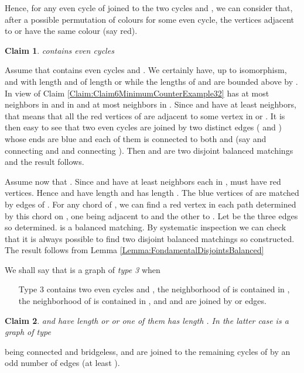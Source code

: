\documentclass{elsart}
\theoremstyle{plain} \theoremheaderfont{\scshape}
\newtheorem{Clm}{Claim}[Thm]
\newenvironment{Prf}{{\bf \noindent Proof } }{\hfill\\}
\newenvironment{PrfClaim}{{\bf Proof }}{{\hfill\tiny{\\}}}
\begin{document}
\begin{Prf}
Hence, for any even cycle of   joined to the two cycles
 and , we can consider that, after a possible permutation
of colours for some even cycle,  the vertices adjacent to  or
 have the same colour (say red).

\begin{Clm} \label{Claim:Claim7MinimumCounterExample32}
 contains  even cycles
\end{Clm}
\begin{PrfClaim}
Assume that  contains  even cycles  and
. We certainly have, up to isomorphism,  and  with
length  and  of length  or  while the lengths of 
and  are bounded above by . In view of Claim
\ref{Claim:Claim6MinimumCounterExample32}  has at most
 neighbors in  and in  and at most  neighbors in
. Since  and  have at least  neighbors, that
means that all the red vertices of  are
adjacent to some vertex in  or . It is then easy to see
that two even cycles are joined  by two distinct edges ( and )
whose ends are blue and each of them is connected to both  and
 (say  and  connecting   and  and  connecting
). Then  and  are two disjoint
balanced matchings and the result follows.

 Assume now that
. Since  and  have at least
 neighbors each in  ,  must have  red vertices.
Hence  and  have length  and  has length . The
 blue vertices of  are matched by  edges of . For any
chord of , we can find a red vertex in each path determined by
this chord on , one being adjacent to  and the other to
. Let  be the three edges so determined.  is a balanced
matching. By systematic inspection we can check that it is
always possible to find two disjoint balanced matchings so
constructed. The result follows from Lemma
\ref{Lemma:FondamentalDisjointsBalanced}
\end{PrfClaim}

We shall say that  is a graph of {\em type 3} when
\begin{itemize}
  \item [Type 3] contains two even cycles  and , the
neighborhood of  is contained in , the neighborhood of
 is contained in , and  and  are joined by 
or  edges.
\end{itemize}


\begin{Clm} \label{Claim:Claim8MinimumCounterExample32}
 and  have length  or  or one of them has length
. In the latter case  is a graph of type 
\end{Clm}
\begin{PrfClaim}
 being connected and  bridgeless,  and  are joined to
the remaining cycles of  by an odd number of edges (at
least ).


\end{PrfClaim}
\end{Prf}
\end{document}
